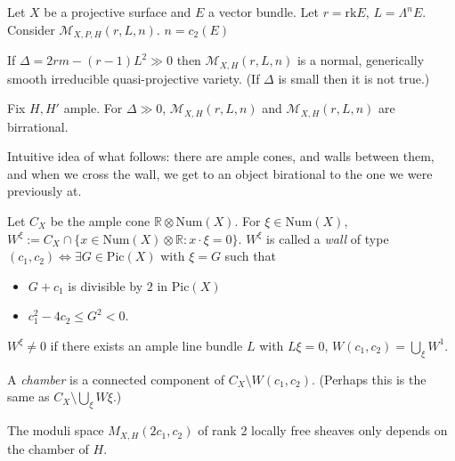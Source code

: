 Let $X$ be a projective surface and $E$ a
vector bundle.
Let $r = \text{rk} E$, $L = \Lambda^{n}E$.
Consider
$\mathcal{M}_{X,P,H}(r,L,n)$.
$n=c_2(E)$

\begin{theorem}
\label{msos-label-013}
If $\Delta=2rm-(r-1)L^2 \gg 0$ then
$\mathcal{M}_{X,H}(r,L,n)$ is a normal,
generically smooth irreducible
quasi-projective variety. (If $\Delta$ is
small
then it is not true.)
\end{theorem}

\begin{theorem}
\label{theorem-birrational-moduli-spaces}
Fix $H,H'$ ample. For $\Delta \gg 0$,
$\mathcal{M}_{X,H}(r,L,n)$ and
$\mathcal{M}_{X,H}(r,L,n)$ are birrational.
\end{theorem}

\medskip\noindent
Intuitive idea of what follows: there are
ample cones, and walls between them,
and when we cross the
wall, we get to an object birational to the
one we were previously at.

\begin{definition}
\label{definition-wall}
Let $C_X$ be the ample cone $\mathbb{R}
\otimes \text{Num}(X)$. For
$\xi \in\text{Num}(X)$,
$W^\xi:=C_X \cap \{x \in \text{Num}(X)
\otimes\mathbb{R}:x\cdot\xi=0\}$.
$W^\xi$ is called a {\it wall} of type
$(c_1,c_2) \iff \exists G \in\text{Pic}(X)$
with $\xi = G$ such that
\begin{itemize}
\item $G+c_1$ is divisible by $2$ in
$\text{Pic}(X)$
\item $c_1^2-4c_2 \leq G^2 <0$.
\end{itemize}
\end{definition}

\begin{remark}
\label{msos-label-014}
$W^\xi \neq 0$ if there exists an ample line
bundle $L$ with $L\xi =0$,
$W(c_1,c_2)=\bigcup_{\xi}W^1$.
\end{remark}

\begin{definition}
\label{definition-chamber}
A {\it chamber} is a connected component of
$C_X\setminus W(c_1,c_2)$. (Perhaps
this is the same as $C_X \setminus
\bigcup_{\xi}W\xi$.)
\end{definition}

\begin{theorem}[Qin]
\label{theorem-Qin}
The moduli space $M_{X,H}(2c_1,c_2)$ of rank
2 locally free sheaves only depends
on the chamber of $H$.
\end{theorem}

